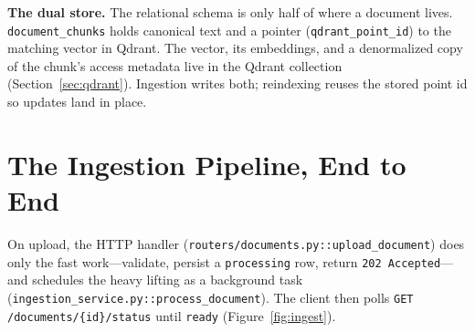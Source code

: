 \documentclass[11pt,a4paper,oneside]{report}
\newcommand{\code}[1]{\texttt{#1}}
\begin{document}
\begin{keyidea}
\textbf{The dual store.} The relational schema is only half of where a document lives.
\code{document\_chunks} holds canonical text and a pointer (\code{qdrant\_point\_id}) to the
matching vector in Qdrant. The vector, its embeddings, and a denormalized copy of the chunk's
access metadata live in the Qdrant collection (Section~\ref{sec:qdrant}). Ingestion writes both;
reindexing reuses the stored point id so updates land in place.
\end{keyidea}

\section{The Ingestion Pipeline, End to End}
On upload, the HTTP handler (\code{routers/documents.py::upload\_document}) does only the fast
work---validate, persist a \code{processing} row, return \code{202 Accepted}---and schedules the
heavy lifting as a background task (\code{ingestion\_service.py::process\_document}). The client
then polls \code{GET /documents/\{id\}/status} until \code{ready} (Figure~\ref{fig:ingest}).
\end{document}
